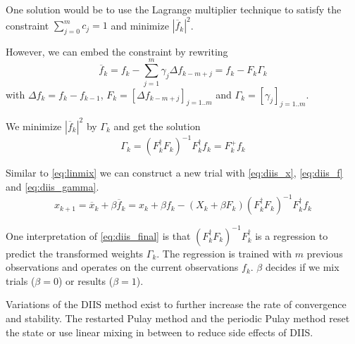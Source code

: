 One solution would be to use the Lagrange multiplier technique to satisfy the constraint \(\sum_{j=0}^{m} c_j = 1\) and minimize \(|\overline{f}_{k}|^2\).\cite{diis_math}

However, we can embed the constraint by rewriting \footnotemark
\begin{equation} \label{eq:diis_f}
\overline{f}_{k} = f_k - \sum_{j=1}^{m} \gamma_j {\Delta f}_{k-m+j} = f_k - F_k \Gamma_k
\end{equation}
with \({\Delta f}_{k} = f_k - f_{k-1}\), \(F_k = [{\Delta f}_{k-m+j}]_{j=1..m}\) and \(\Gamma_k = [\gamma_j]_{j=1..m}\).


We minimize \(|\overline{f}_{k}|^2\) by \(\Gamma_k\) and get the solution \footnotemark
\begin{equation} \label{eq:diis_gamma}
\Gamma_k = (F_k^\dagger F_k)^{-1} F_k^\dagger f_k = F_k^+ f_k
\end{equation}


Similar to \eqref{eq:linmix} we can construct a new trial with \eqref{eq:diis_x}, \eqref{eq:diis_f} and \eqref{eq:diis_gamma}.
\begin{equation} \label{eq:diis_final}
x_{k+1} = \overline{x}_k + \beta \overline{f}_k = x_k + \beta f_k - (X_k + \beta F_k) (F_k^\dagger F_k)^{-1} F_k^\dagger f_k
\end{equation}

One interpretation of \eqref{eq:diis_final} is that \((F_k^\dagger F_k)^{-1} F_k^\dagger\) is a regression to predict the transformed weights $\Gamma_k$. The regression is trained with \(m\) previous observations and operates on the current observations \(f_k\). $\beta$ decides if we mix trials (\(\beta = 0\)) or results (\(\beta = 1\)).

Variations of the DIIS method exist to further increase the rate of convergence and stability. The restarted Pulay method\cite{diis_restarted} and the periodic Pulay method\cite{diis_periodic} reset the state or use linear mixing in between to reduce side effects of DIIS.

